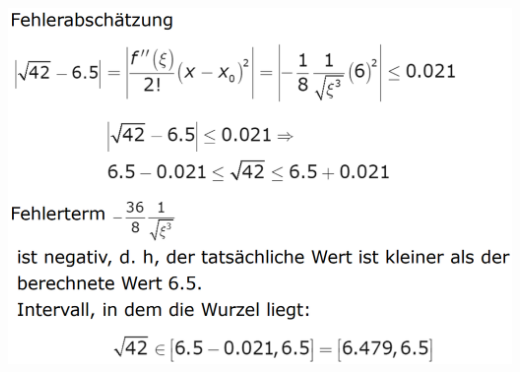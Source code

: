 \documentclass[12pt,a4paper]{article}
\begin{document}
\includegraphics[width=1\textwidth]{BIlder/V1/20.png}\\
\end{document}

